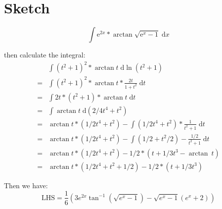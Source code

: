 \documentclass{article}
\begin{document}
\section{Sketch}
\[
  \int \mathrm{e}^{2x}*\arctan\sqrt{\mathrm{e}^x-1}\;\mathrm{d}x
\]

then calculate the integral:
\begin{align*}
  &\int (t^2+1)^2*\arctan t\;\mathrm{d} \ln(t^2+1)\\
    = & \int (t^2+1)^2* \arctan t* \frac{2t}{1+t^2}\;\mathrm{d}t\\
    = & \int 2t*(t^2+1)*\arctan t\;\mathrm{d}t\\
    = & \int \arctan t\;\mathrm{d}(2/4 t^4+t^2)\\
    = & \arctan t* (1/2t^4+t^2) - \int (1/2t^4+t^2)*\frac{1}{t^2+1}\;\mathrm{d}t\\
    = & \arctan t* (1/2t^4+t^2) - \int (1/2 +t^2/2) - \frac{1/2}{t^2+1}\;\mathrm{d}t\\
    = & \arctan t* (1/2t^4+t^2) - 1/2*(t + 1/3t^3-\arctan\ t) \\
    = & \arctan t* (1/2t^4+t^2+1/2) - 1/2*(t+1/3t^3 )
\end{align*}

Then we have:
\[
  \mathrm{LHS} = \frac{1}{6} \left(3 e^{2 x} \tan ^{-1}\left(\sqrt{e^x-1}\right)-\sqrt{e^x-1} \left(e^x+2\right)\right)
\]
\end{document}
